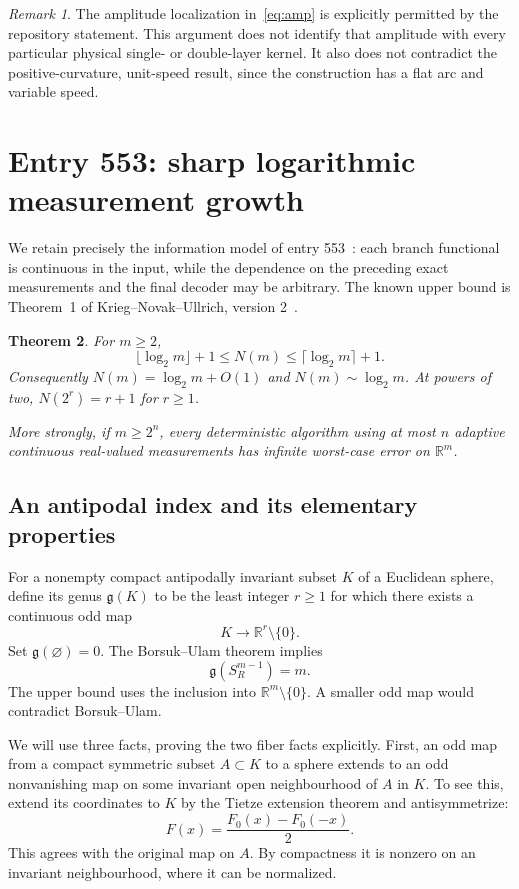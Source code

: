 \documentclass[11pt,a4paper]{article}
\newtheorem{theorem}{Theorem}[section]
\theoremstyle{remark}
\newtheorem{remark}[theorem]{Remark}
\newcommand{\R}{\mathbb R}
\newcommand{\gen}{\mathfrak g}
\begin{document}
\begin{remark}
The amplitude localization in~\eqref{eq:amp} is explicitly permitted by the repository statement. This argument does not identify that amplitude with every particular physical single- or double-layer kernel. It also does not contradict the positive-curvature, unit-speed result, since the construction has a flat arc and variable speed.
\end{remark}

\newpage
\section{Entry 553: sharp logarithmic measurement growth}\label{sec:adaptive}

We retain precisely the information model of entry 553~\cite{repo553}: each branch functional is continuous in the input, while the dependence on the preceding exact measurements and the final decoder may be arbitrary. The known upper bound is Theorem~1 of Krieg--Novak--Ullrich, version 2~\cite{knu}.

\begin{theorem}\label{thm:adaptive}
For $m\ge2$,
\[
 \boxed{\lfloor\log_2m\rfloor+1\le N(m)
 \le\lceil\log_2m\rceil+1.}
\]
Consequently $N(m)=\log_2m+O(1)$ and $N(m)\sim\log_2m$. At powers of two, $N(2^r)=r+1$ for $r\ge1$.

More strongly, if $m\ge2^n$, every deterministic algorithm using at most $n$ adaptive continuous real-valued measurements has infinite worst-case error on $\R^m$.
\end{theorem}

\subsection{An antipodal index and its elementary properties}

For a nonempty compact antipodally invariant subset $K$ of a Euclidean sphere, define its genus $\gen(K)$ to be the least integer $r\ge1$ for which there exists a continuous odd map
\[
 K\longrightarrow\R^r\setminus\{0\}.
\]
Set $\gen(\varnothing)=0$. The Borsuk--Ulam theorem implies
\begin{equation}\label{eq:gensphere}
 \gen(S_R^{m-1})=m.
\end{equation}
The upper bound uses the inclusion into $\R^m\setminus\{0\}$. A smaller odd map would contradict Borsuk--Ulam.

We will use three facts, proving the two fiber facts explicitly. First, an odd map from a compact symmetric subset $A\subset K$ to a sphere extends to an odd nonvanishing map on some invariant open neighbourhood of $A$ in $K$. To see this, extend its coordinates to $K$ by the Tietze extension theorem and antisymmetrize:
\[
 F(x)=\frac{F_0(x)-F_0(-x)}2.
\]
This agrees with the original map on $A$. By compactness it is nonzero on an invariant neighbourhood, where it can be normalized.
\end{document}
